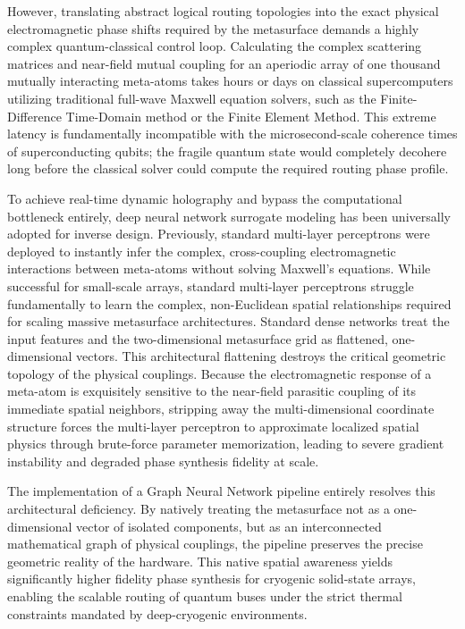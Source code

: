 \documentclass[11pt, a4paper]{article}
\begin{document}
However, translating abstract logical routing topologies into the exact physical electromagnetic phase shifts required by the metasurface demands a highly complex quantum-classical control loop. Calculating the complex scattering matrices and near-field mutual coupling for an aperiodic array of one thousand mutually interacting meta-atoms takes hours or days on classical supercomputers utilizing traditional full-wave Maxwell equation solvers, such as the Finite-Difference Time-Domain method or the Finite Element Method. This extreme latency is fundamentally incompatible with the microsecond-scale coherence times of superconducting qubits; the fragile quantum state would completely decohere long before the classical solver could compute the required routing phase profile.

To achieve real-time dynamic holography and bypass the computational bottleneck entirely, deep neural network surrogate modeling has been universally adopted for inverse design. Previously, standard multi-layer perceptrons were deployed to instantly infer the complex, cross-coupling electromagnetic interactions between meta-atoms without solving Maxwell's equations. While successful for small-scale arrays, standard multi-layer perceptrons struggle fundamentally to learn the complex, non-Euclidean spatial relationships required for scaling massive metasurface architectures. Standard dense networks treat the input features and the two-dimensional metasurface grid as flattened, one-dimensional vectors. This architectural flattening destroys the critical geometric topology of the physical couplings. Because the electromagnetic response of a meta-atom is exquisitely sensitive to the near-field parasitic coupling of its immediate spatial neighbors, stripping away the multi-dimensional coordinate structure forces the multi-layer perceptron to approximate localized spatial physics through brute-force parameter memorization, leading to severe gradient instability and degraded phase synthesis fidelity at scale.

The implementation of a Graph Neural Network pipeline entirely resolves this architectural deficiency. By natively treating the metasurface not as a one-dimensional vector of isolated components, but as an interconnected mathematical graph of physical couplings, the pipeline preserves the precise geometric reality of the hardware. This native spatial awareness yields significantly higher fidelity phase synthesis for cryogenic solid-state arrays, enabling the scalable routing of quantum buses under the strict thermal constraints mandated by deep-cryogenic environments.
\end{document}
